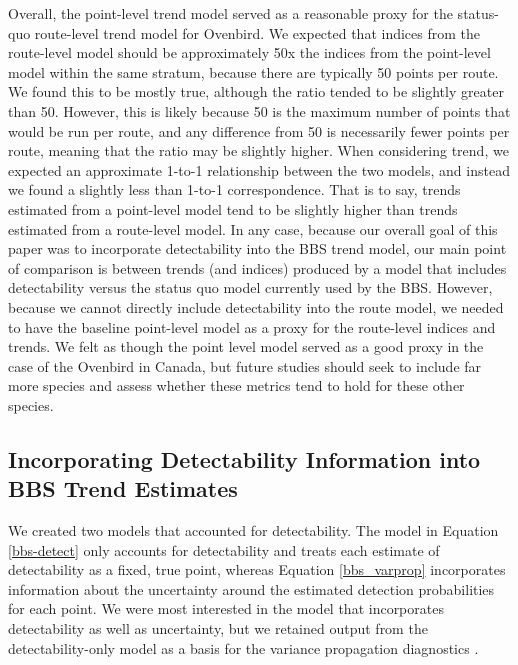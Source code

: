 \par Overall, the point-level trend model served as a reasonable proxy for the status-quo route-level trend model for Ovenbird.
We expected that indices from the route-level model should be approximately 50x the indices from the point-level model within the same stratum, because there are typically 50 points per route.
We found this to be mostly true, although the ratio tended to be slightly greater than 50.
However, this is likely because 50 is the maximum number of points that would be run per route, and any difference from 50 is necessarily fewer points per route, meaning that the ratio may be slightly higher.
When considering trend, we expected an approximate 1-to-1 relationship between the two models, and instead we found a slightly less than 1-to-1 correspondence.
That is to say, trends estimated from a point-level model tend to be slightly higher than trends estimated from a route-level model.
In any case, because our overall goal of this paper was to incorporate detectability into the BBS trend model, our main point of comparison is between trends (and indices) produced by a model that includes detectability versus the status quo model currently used by the BBS.
However, because we cannot directly include detectability into the route model, we needed to have the baseline point-level model as a proxy for the route-level indices and trends.
We felt as though the point level model served as a good proxy in the case of the Ovenbird in Canada, but future studies should seek to include far more species and assess whether these metrics tend to hold for these other species. 

\subsection{Incorporating Detectability Information into BBS Trend Estimates}

\par We created two models that accounted for detectability.
The model in Equation \ref{bbs-detect} only accounts for detectability and treats each estimate of detectability as a fixed, true point, whereas Equation \ref{bbs_varprop} incorporates information about the uncertainty around the estimated detection probabilities for each point.
We were most interested in the model that incorporates detectability as well as uncertainty, but we retained output from the detectability-only model as a basis for the variance propagation diagnostics \citep{bravington_variance_2021}.


